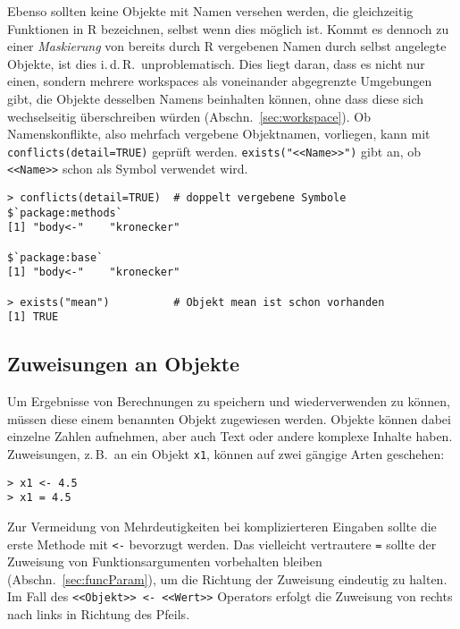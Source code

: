 Ebenso sollten keine Objekte mit Namen versehen werden, die gleichzeitig Funktionen in R bezeichnen, selbst wenn dies möglich ist. Kommt es dennoch zu einer \emph{Maskierung} von bereits durch R vergebenen Namen durch selbst angelegte Objekte, ist dies i.\,d.\,R.\ unproblematisch. Dies liegt daran, dass es nicht nur einen, sondern mehrere workspaces als voneinander abgegrenzte Umgebungen gibt, die Objekte desselben Namens beinhalten können, ohne dass diese sich wechselseitig überschreiben würden (Abschn.\ \ref{sec:workspace}). Ob Namenskonflikte, also mehrfach vergebene Objektnamen, vorliegen, kann mit \lstinline!conflicts(detail=TRUE)! geprüft werden.  \lstinline!exists("<<Name>>")! gibt an, ob \lstinline!<<Name>>! schon als Symbol verwendet wird.
\begin{lstlisting}
> conflicts(detail=TRUE)  # doppelt vergebene Symbole
$`package:methods`
[1] "body<-"    "kronecker"

$`package:base`
[1] "body<-"    "kronecker"

> exists("mean")          # Objekt mean ist schon vorhanden
[1] TRUE
\end{lstlisting}

\subsection{Zuweisungen an Objekte}

Um Ergebnisse von Berechnungen zu speichern und wiederverwenden zu können, müssen diese einem benannten Objekt zugewiesen werden. Objekte können dabei einzelne Zahlen aufnehmen, aber auch Text oder andere komplexe Inhalte haben. Zuweisungen, z.\,B.\ an ein Objekt \lstinline!x1!, können auf zwei gängige Arten geschehen:
\begin{lstlisting}
> x1 <- 4.5
> x1 = 4.5
\end{lstlisting}

Zur Vermeidung von Mehrdeutigkeiten bei komplizierteren Eingaben sollte die erste Methode mit \lstinline!<-! bevorzugt werden. Das vielleicht vertrautere \lstinline!=! sollte der Zuweisung von Funktionsargumenten vorbehalten bleiben (Abschn.\ \ref{sec:funcParam}), um die Richtung der Zuweisung eindeutig zu halten. Im Fall des \lstinline!<<Objekt>> <- <<Wert>>! Operators erfolgt die Zuweisung von rechts nach links in Richtung des Pfeils.

